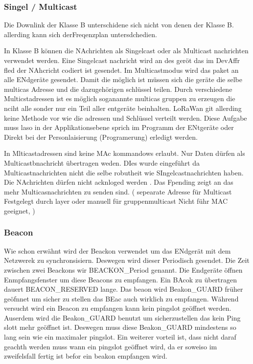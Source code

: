 \documentclass[a4paper,12pt]{article}
\begin{document}
            \subsubsection{Singel / Multicast}
                Die Downlink der Klasse B unterschidene sich nicht von denen der Klasse B. allerding kann sich derFreqenzplan untersdchedien.
                
                In Klasse B können die NAchrichten als Singelcast oder als Multicast nachrichten verwendet werden. Eine Singelcast nachricht wird an des geröt das im DevAffr fled der NAhcricht codiert ist gesendet. Im Multicastmodus wird das paket an alle ENdgeräte gesendet.
                Damit die möglich ist müssen sich die geräte die selbe multicas Adresse und die dazugehörigen schlüssel teilen. Durch verschiedene Multicstadressen ist es möglich soganannte
                multicas gruppen zu erzeugen die nciht alle sonder nur ein Teil aller entgeräte beinhalten. LoRaWan git allerding keine Methode vor wie die adressen und Schlüssel verteilt werden. Diese Aufgabe muss laso in der Applikationsebene sprich im Programm der ENtgeräte oder Direkt bei der Personlaisierung (Programerung) erledigt werden.
                

                In Mlticastadressen sind keine MAc kommandows erlaubt. Nur Daten dürfen als Multicastbnachricht übertragen weden. DIes wurde eingeführt da Multicastnachrichten nicht die selbe robutheit wie SIngelcastnachrichten haben.
                Die NAchrichten dürfen nicht acknloged werden . Das Fpending zeigt an das mehr Multicasnachrichten zu senden sind.
                \cite{LoRaSpec}(
                    sepearate Adresse für Multicast
                    Festgelegt durch layer oder manuell für gruppenmulticast
                    Nicht führ MAC geeignet, 
                )
            \subsubsection{Beacon}
                Wie schon erwähnt wird der Beackon verwendet um das ENdgerät mit dem Netzwerek zu synchronsisiern. Deswegen wird dieser Periodisch gesendet. Die Zeit zwischen zwei Beackons wir BEACKON\_Period genannt.
                Die Endgeräte öffnen Enmpfangsfenster um diese Beacons zu empfangen. Ein BAcok zu übertragen dauert BEACON\_RESERVED lange. Das beaon wird Beakon\_GUARD früher geöfnnet um sicher zu stellen das BEac auch wirklich zu empfangen. Während versucht wird ein Beacon zu empfangen kann kein pingslot geöffnet werden.
                Auserdem wird die Beakon\_GUARD benutzt um sicherzustellen das kein Ping slott mehr geöffnet ist. Deswegen muss diese Beakon\_GUARD mindestens so lang sein wie ein maximaler pingslot.   Ein weiterer vorteil ist, dass nicht daraf geachth werden muss wann ein pingslot geöffnet wird, da er soweiso im zweifelsfall fertig ist befor ein beakon empfangen wird.
\end{document}
